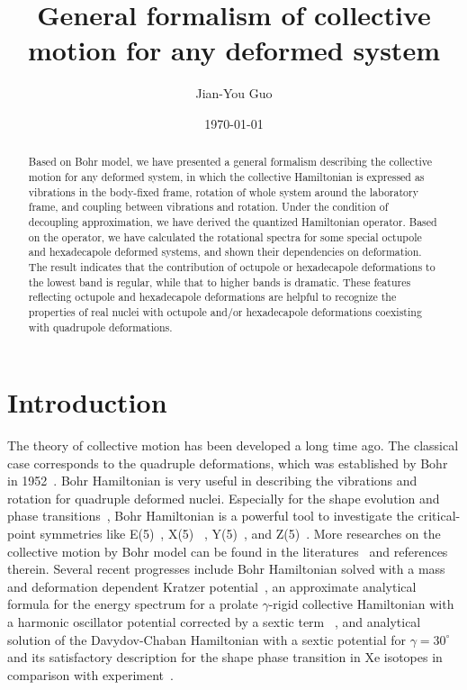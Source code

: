\documentclass[twocolumn,prc,showpacs,preprintnumbers,superscriptaddress,floatfix]{revtex4}
\begin{document}
\title{General formalism of collective motion for any deformed system}
\author{Jian-You Guo }
\date{\today }

\begin{abstract}
Based on Bohr model, we have presented a general formalism describing the
collective motion for any deformed system, in which the collective
Hamiltonian is expressed as vibrations in the body-fixed frame, rotation of
whole system around the laboratory frame, and coupling between vibrations
and rotation. Under the condition of decoupling approximation, we have
derived the quantized Hamiltonian operator. Based on the operator, we have
calculated the rotational spectra for some special octupole and hexadecapole
deformed systems, and shown their dependencies on deformation. The result
indicates that the contribution of octupole or hexadecapole deformations to
the lowest band is regular, while that to higher bands is dramatic. These
features reflecting octupole and hexadecapole deformations are helpful to
recognize the properties of real nuclei with octupole and/or hexadecapole
deformations coexisting with quadrupole deformations.
\end{abstract}

\maketitle

\section{Introduction}

The theory of collective motion has been developed a long time ago. The
classical case corresponds to the quadruple deformations, which was
established by Bohr in 1952~\cite{Bohr521,Bohr522}. Bohr Hamiltonian is very
useful in describing the vibrations and rotation for quadruple deformed
nuclei. Especially for the shape evolution and phase transitions~\cite%
{Casten07}, Bohr Hamiltonian is a powerful tool to investigate the
critical-point symmetries like E(5)~\cite{Iachello00}, X(5)~\cite{Iachello01}%
, Y(5)~\cite{Iachello03}, and Z(5)~\cite{Bonatsos04}. More researches on the
collective motion by Bohr model can be found in the literatures~\cite%
{Casten06,Prochniak09,Cejnar10} and references therein. Several recent
progresses include Bohr Hamiltonian solved with a mass and deformation
dependent Kratzer potential~\cite{Bonatsos13}, an approximate analytical
formula for the energy spectrum for a prolate $\gamma $-rigid collective
Hamiltonian with a harmonic oscillator potential corrected by a sextic term~%
\cite{Budaca14}, and analytical solution of the Davydov-Chaban Hamiltonian
with a sextic potential for $\gamma =30^{\circ }$ and its satisfactory
description for the shape phase transition in Xe isotopes in comparison with
experiment~\cite{Buganu15}.
\end{document}

